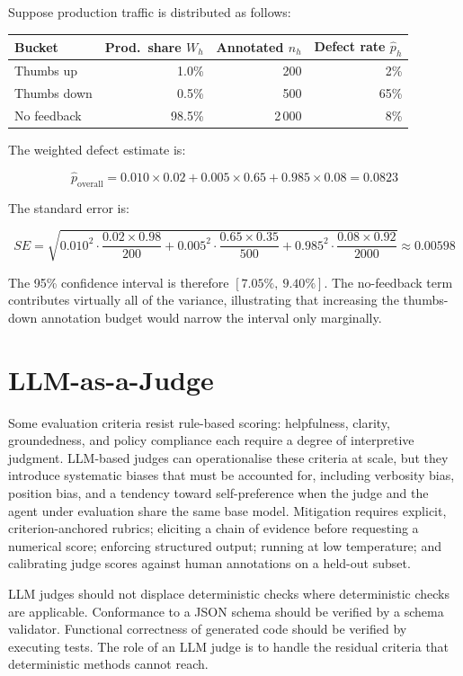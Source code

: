 Suppose production traffic is distributed as follows:

\begin{center}
\begin{tabular}{lrrr}
\toprule
\textbf{Bucket} & \textbf{Prod.\ share} $W_h$ & \textbf{Annotated} $n_h$ 
    & \textbf{Defect rate} $\hat{p}_h$ \\
\midrule
Thumbs up   & 1.0\%  & 200   & 2\%  \\
Thumbs down & 0.5\%  & 500   & 65\% \\
No feedback & 98.5\% & 2\,000 & 8\%  \\
\bottomrule
\end{tabular}
\end{center}

The weighted defect estimate is:

\[
\hat{p}_{\text{overall}} = 0.010 \times 0.02 + 0.005 \times 0.65 + 0.985 \times 0.08 
= 0.0823
\]

The standard error is:

\[
SE = \sqrt{
  0.010^2 \cdot \frac{0.02 \times 0.98}{200}
  + 0.005^2 \cdot \frac{0.65 \times 0.35}{500}
  + 0.985^2 \cdot \frac{0.08 \times 0.92}{2000}
} \approx 0.00598
\]

The 95\% confidence interval is therefore $[7.05\%,\ 9.40\%]$. The no-feedback term 
contributes virtually all of the variance, illustrating that increasing the thumbs-down 
annotation budget would narrow the interval only marginally.

\section{LLM-as-a-Judge}

Some evaluation criteria resist rule-based scoring: helpfulness, clarity, groundedness, and 
policy compliance each require a degree of interpretive judgment. LLM-based judges can 
operationalise these criteria at scale, but they introduce systematic biases that must be 
accounted for, including verbosity bias, position bias, and a tendency toward self-preference 
when the judge and the agent under evaluation share the same base model. Mitigation requires 
explicit, criterion-anchored rubrics; eliciting a chain of evidence before requesting a 
numerical score; enforcing structured output; running at low temperature; and calibrating 
judge scores against human annotations on a held-out subset.

LLM judges should not displace deterministic checks where deterministic checks are 
applicable. Conformance to a JSON schema should be verified by a schema validator. 
Functional correctness of generated code should be verified by executing tests. The role 
of an LLM judge is to handle the residual criteria that deterministic methods cannot reach.

